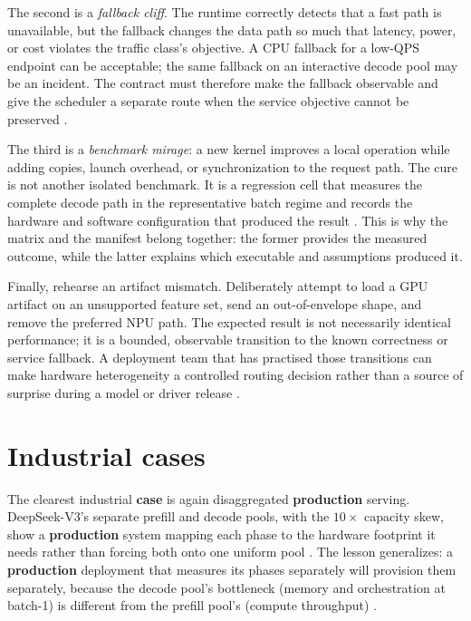 The second is a \emph{fallback cliff}. The runtime correctly detects that a fast path is unavailable, but the fallback changes the data path so much that latency, power, or cost violates the traffic class's objective. A CPU fallback for a low-QPS endpoint can be acceptable; the same fallback on an interactive decode pool may be an incident. The contract must therefore make the fallback observable and give the scheduler a separate route when the service objective cannot be preserved \citep{patel2025llminference,rotem2018glow}.

The third is a \emph{benchmark mirage}: a new kernel improves a local operation while adding copies, launch overhead, or synchronization to the request path. The cure is not another isolated benchmark. It is a regression cell that measures the complete decode path in the representative batch regime and records the hardware and software configuration that produced the result \citep{taxbreak2026,memoryfloor2026}. This is why the matrix and the manifest belong together: the former provides the measured outcome, while the latter explains which executable and assumptions produced it.

Finally, rehearse an artifact mismatch. Deliberately attempt to load a GPU artifact on an unsupported feature set, send an out-of-envelope shape, and remove the preferred NPU path. The expected result is not necessarily identical performance; it is a bounded, observable transition to the known correctness or service fallback. A deployment team that has practised those transitions can make hardware heterogeneity a controlled routing decision rather than a source of surprise during a model or driver release \citep{iree2024,amd2024aie}.

\section{Industrial cases}
\label{sec:ch24_industrial_cases}

The clearest industrial \textbf{case} is again disaggregated \textbf{production} serving. DeepSeek-V3's separate prefill and decode pools, with the $10\times$ capacity skew, show a \textbf{production} system mapping each phase to the hardware footprint it needs rather than forcing both onto one uniform pool \citep{patel2025llminference}. The lesson generalizes: a \textbf{production} deployment that measures its phases separately will provision them separately, because the decode pool's bottleneck (memory and orchestration at batch-1) is different from the prefill pool's (compute throughput) \citep{taxbreak2026,kwon2023vllm}.

